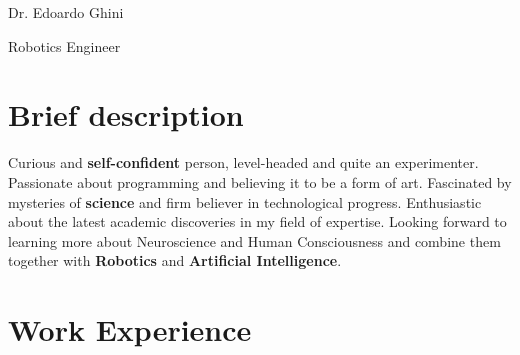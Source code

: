 \documentclass[
	10pt, %
]{FreemanCV}
\begin{document}
\begin{paracol}{2} %


\parbox[][0.09\textheight][c]{\linewidth}{ %
	\centering %
	
	{\sffamily\Huge Dr. Edoardo Ghini} %
	
	\medskip %
	
	{\Huge\textcolor{headings}{Robotics Engineer}}
	
	\vfill %
}

\section{Brief description}

  Curious and \textbf{self-confident} person, level-headed and quite an experimenter.
Passionate about programming and believing it to be a form of art.
  Fascinated by mysteries of \textbf{science} and firm believer in technological progress.
Enthusiastic about the latest academic discoveries in my field of expertise.
  Looking forward to learning more about Neuroscience and Human Consciousness and combine them together with \textbf{Robotics} and \textbf{Artificial Intelligence}.



\section{Work Experience}




\end{paracol}
\end{document}
